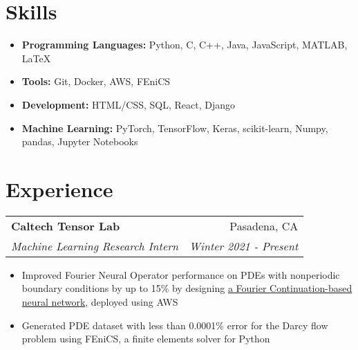 \documentclass[letterpaper,11pt]{article}
\makeatletter
\newcommand{\resitem}[1]{\item[--] #1 \vspace{-8pt}}
\newcommand{\ressubheading}[4]{
	\vspace{6pt}
	\begin{tabular*}{7.5in}{l@{\extracolsep{\fill}}r}
			\textbf{#1} & #2 \\
			\textit{#3} & \textit{#4}
	\end{tabular*}
	\vspace{-12pt}
}
\newcommand{\myitem}[1]{\item[--] #1 \vspace{-8pt}}
\newcommand{\mysubitem}[1]{\item #1 \vspace{-4pt}}
\makeatother
\begin{document}


\section{Skills}

\vspace{6pt}
\begin{itemize}[leftmargin=*]
	\resitem {\textbf{Programming Languages:} Python, C, C++, Java, JavaScript, MATLAB, \LaTeX}
	\resitem {\textbf{Tools:} Git, Docker, AWS, FEniCS}
	\resitem{\textbf{Development:} HTML/CSS, SQL, React, Django}
	\resitem{\textbf{Machine Learning:} PyTorch, TensorFlow, Keras, scikit-learn, Numpy, pandas, Jupyter Notebooks}
\end{itemize}


\section{Experience}

	\ressubheading{Caltech Tensor Lab}{Pasadena, CA}{Machine Learning Research Intern}{Winter 2021 - Present}
		\begin{itemize}[leftmargin=*]
			\resitem{Improved Fourier Neural Operator performance on PDEs with nonperiodic boundary conditions by up to 15\% by designing \href{https://symposium.foragerone.com/caltech-sfp-summer-seminar-day-2021/presentations/32348}{a Fourier Continuation-based neural network}, deployed using AWS}
			\resitem{Generated PDE dataset with less than 0.0001\% error for the Darcy flow problem using FEniCS, a finite elements solver for Python}
		\end{itemize}
\end{document}
